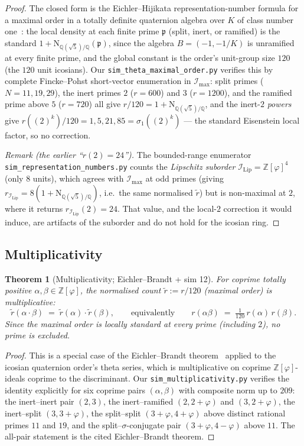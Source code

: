 \documentclass[11pt,a4paper]{article}
\newtheorem{theorem}{Theorem}
\theoremstyle{definition}
\theoremstyle{remark}
\newcommand{\Z}{\mathbb{Z}}
\newcommand{\IIlip}{\mathcal{I}_{\mathrm{Lip}}}
\newcommand{\IImax}{\mathcal{I}_{\mathrm{max}}}
\newcommand{\NQ}{\mathrm{N}_{\mathbb{Q}(\sqrt{5})/\mathbb{Q}}}
\newcommand{\Zphi}{\Z[\varphi]}
\begin{document}
\begin{proof}
The closed form is the Eichler--Hijikata representation-number formula for a
maximal order in a totally definite quaternion algebra over $K$ of class
number one~\cite{eichler1958,hijikata1974}: the local density at each finite
prime $\mathfrak p$ (split, inert, or ramified) is the standard
$1 + \NQ(\mathfrak p)$, since the algebra $B=(-1,-1/K)$ is unramified at every
finite prime, and the global constant is the order's unit-group size $120$
(the $120$ unit icosians). Our \texttt{sim\_theta\_maximal\_order.py} verifies
this by complete Fincke--Pohst short-vector enumeration in $\IImax$: split
primes ($N=11,19,29$), the inert primes $2$ ($r=600$) and $3$ ($r=1200$), and
the ramified prime above $5$ ($r=720$) all give $r/120 = 1+\NQ$, and the inert-$2$
\emph{powers} give $r((2)^k)/120 = 1,5,21,85 = \sigma_1((2)^k)$ --- the standard
Eisenstein local factor, so no correction.

\emph{Remark (the earlier ``$r(2)=24$'').} The bounded-range enumerator
\texttt{sim\_representation\_numbers.py} counts the \emph{Lipschitz suborder}
$\IIlip = \Zphi^4$ (only $8$ units), which agrees with $\IImax$ at odd primes
(giving $r_{\IIlip}=8(1+\NQ)$, i.e.\ the same normalised $\widetilde r$) but is
non-maximal at $2$, where it returns $r_{\IIlip}(2)=24$. That value, and the
local-$2$ correction it would induce, are artifacts of the suborder and do not
hold for the icosian ring.
\end{proof}

\subsection{Multiplicativity}

\begin{theorem}[Multiplicativity; Eichler--Brandt + sim 12]\label{thm:mult}
For coprime totally positive $\alpha, \beta \in \Zphi$, the normalised count
$\widetilde r := r/120$ (maximal order) is multiplicative:
\[
  \widetilde r(\alpha\!\cdot\!\beta) \;=\; \widetilde r(\alpha)\!\cdot\! \widetilde r(\beta),
  \qquad\text{equivalently}\qquad
  r(\alpha\beta) \;=\; \tfrac{1}{120}\,r(\alpha)\,r(\beta).
\]
Since the maximal order is locally standard at every prime (including $2$),
no prime is excluded.
\end{theorem}

\begin{proof}
This is a special case of the Eichler--Brandt
theorem~\cite{eichler1958,hijikata1974} applied to the icosian
quaternion order's theta series, which is multiplicative on coprime
$\Zphi$-ideals coprime to the discriminant. Our
\texttt{sim\_multiplicativity.py} verifies the identity explicitly for
six coprime pairs $(\alpha, \beta)$ with composite norm up to $209$:
the inert--inert pair $(2,3)$, the inert--ramified $(2, 2+\varphi)$ and
$(3, 2+\varphi)$, the inert--split $(3, 3+\varphi)$, the split--split
$(3+\varphi, 4+\varphi)$ above distinct rational primes $11$ and $19$,
and the split--$\sigma$-conjugate pair $(3+\varphi, 4-\varphi)$ above
$11$. The all-pair statement is the cited Eichler--Brandt theorem.
\end{proof}
\end{document}
